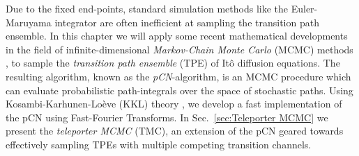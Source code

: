 Due to the fixed end-points, standard simulation methods like the Euler-Maruyama integrator \citep{kloedenNumericalSolutionStochastic2011} are often inefficient at sampling the transition path ensemble. In this chapter we will apply some recent mathematical developments in the field of infinite-dimensional \textit{Markov-Chain Monte Carlo} (MCMC) methods \citep{cotterMCMCMethodsFunctions2013, beskosMCMCMETHODSDIFFUSION2008, hairerAnalysisSPDEsArising2005, hairerAnalysisSPDEsArising2007, hairerSpectralGapsMetropolis2014},
to sample the \textit{transition path ensemble} (TPE) of Itô diffusion equations. The resulting algorithm, known as the \textit{pCN}-algorithm, is an MCMC procedure which can evaluate probabilistic path-integrals over the space of stochastic paths. Using Kosambi-Karhunen-Lo\`eve (KKL) theory \citep{kosambiParallelismPathspaces, karhunenUeberLineareMethoden1947, loeveProbabilityTheory1977}, we develop a fast implementation of the pCN using Fast-Fourier Transforms. In Sec.~\ref{sec:Teleporter MCMC} we present the \textit{teleporter MCMC} (TMC), an extension of the pCN geared towards effectively sampling TPEs with multiple competing transition channels. 

